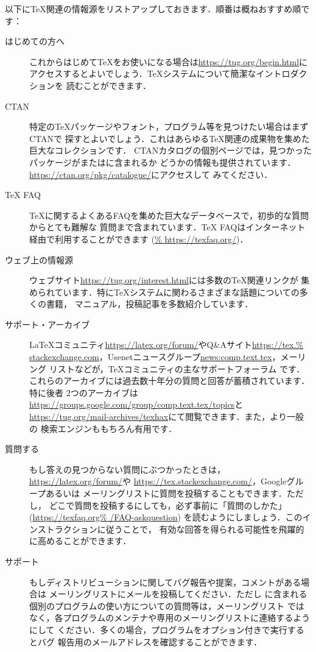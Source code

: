 \documentclass[uplatex,dvipdfmx,tombow]{jsarticle}
\begin{document}
以下に\TeX 関連の情報源をリストアップしておきます．順番は概ねおすすめ順です：
%
\begin{description}
\item[はじめての方へ]
これからはじめて\TeX をお使いになる場合は\url{https://tug.org/begin.html}に
アクセスするとよいでしょう．\TeX システムについて簡潔なイントロダクションを
読むことができます．

\item[CTAN]
特定の\TeX パッケージやフォント，プログラム等を見つけたい場合はまずCTANで
探すとよいでしょう．これはあらゆる\TeX 関連の成果物を集めた巨大なコレクションです．
CTANカタログの個別ページでは，見つかったパッケージが\TL または\MIKTEX に含まれるか
どうかの情報も提供されています．\url{https://ctan.org/pkg/catalogue/}にアクセスして
みてください．

\item[{\TeX} FAQ]
\TeX に関するよくあるFAQを集めた巨大なデータベースで，初歩的な質問からとても難解な
質問まで含まれています．{\TeX} FAQはインターネット経由で利用することができます (\url{%
https://texfaq.org/})．

\item[ウェブ上の情報源]
ウェブサイト\url{https://tug.org/interest.html}には多数の\TeX 関連リンクが
集められています．特に\TeX システムに関わるさまざまな話題についての多くの書籍，
マニュアル，投稿記事を多数紹介しています．

\item[サポート・アーカイブ]
\LaTeX コミュニティ\url{https://latex.org/forum/}やQ\&Aサイト\url{https://tex.%
stackexchange.com}，Usenetニュースグループ\url{news:comp.text.tex}，メーリング
リストなどが，\TeX コミュニティの主なサポートフォーラム
です．これらのアーカイブには過去数十年分の質問と回答が蓄積されています．特に後者
2つのアーカイブは\url{https://groups.google.com/group/comp.text.tex/topics}と
\url{https://tug.org/mail-archives/texhax}にて閲覧できます．また，より一般の
検索エンジンももちろん有用です．

\item[質問する]
もし答えの見つからない質問にぶつかったときは，\url{https://latex.org/forum/}や
\url{https://tex.stackexchange.com/}，Googleグループあるいは
メーリングリストに質問を投稿することもできます．ただし，
どこで質問を投稿するにしても，必ず事前に「質問のしかた」(\url{https://texfaq.org%
/FAQ-askquestion}) を読むようにしましょう．このインストラクションに従うことで，
有効な回答を得られる可能性を飛躍的に高めることができます．

\item[\TL サポート]
もし\TL ディストリビューションに関してバグ報告や提案，コメントがある場合は
\TL メーリングリストにメールを投稿してください．ただし
\TL に含まれる個別のプログラムの使い方についての質問等は，\TL メーリングリスト
ではなく，各プログラムのメンテナや専用のメーリングリストに連絡するようにして
ください．多くの場合，プログラムをオプション付きで実行するとバグ
報告用のメールアドレスを確認することができます．
\end{description}
\end{document}
